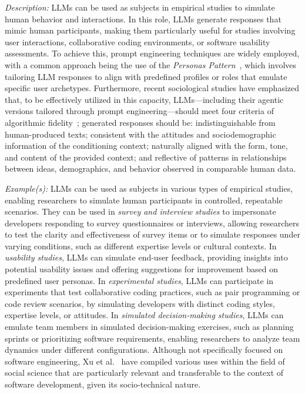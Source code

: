 \documentclass[11pt]{article}
\begin{document}
\emph{Description:} LLMs can be used as subjects in empirical studies to simulate human behavior and interactions. In this role, LLMs generate responses that mimic human participants, making them particularly useful for studies involving user interactions, collaborative coding environments, or software usability assessments. 
To achieve this, prompt engineering techniques are widely employed, with a common approach being the use of the \textit{Personas Pattern}~\cite{DBLP:journals/corr/abs-2308-07702}, which involves tailoring LLM responses to align with predefined profiles or roles that emulate specific user archetypes. 
Furthermore, recent sociological studies have emphasized that, to be effectively utilized in this capacity, LLMs—including their agentic versions tailored through prompt engineering—should meet four criteria of algorithmic fidelity~\cite{DBLP:journals/corr/abs-2209-06899}; generated responses should be: indistinguishable from human-produced texts; consistent with the attitudes and sociodemographic information of the conditioning context; naturally aligned with the form, tone, and content of the provided context; and reflective of patterns in relationships between ideas, demographics, and behavior observed in comparable human data.

\emph{Example(s):} LLMs can be used as subjects in various types of empirical studies, enabling researchers to simulate human participants in controlled, repeatable scenarios. 
They can be used in \emph{survey and interview studies} to impersonate developers responding to survey questionnaires or interviews, allowing researchers to test the clarity and effectiveness of survey items or to simulate responses under varying conditions, such as different expertise levels or cultural contexts. In \emph{usability studies}, LLMs can simulate end-user feedback, providing insights into potential usability issues and offering suggestions for improvement based on predefined user personas. In \emph{experimental studies}, LLMs can participate in experiments that test collaborative coding practices, such as pair programming or code review scenarios, by simulating developers with distinct coding styles, expertise levels, or attitudes. In \emph{simulated decision-making studies}, LLMs can emulate team members in simulated decision-making exercises, such as planning sprints or prioritizing software requirements, enabling researchers to analyze team dynamics under different configurations.
Although not specifically focused on software engineering, Xu et al.~\cite{DBLP:journals/ipm/XuSRGPLSH24} have compiled various uses within the field of social science that are particularly relevant and transferable to the context of software development, given its socio-technical nature.
\end{document}
